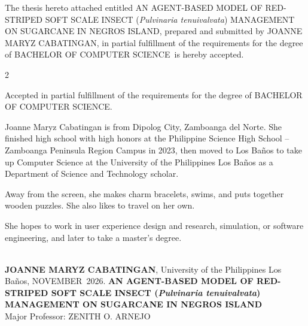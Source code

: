 \documentclass{icsthesis}
\renewcommand{\TITLE}{AN AGENT-BASED MODEL OF RED-STRIPED SOFT SCALE INSECT (\emph{Pulvinaria tenuivalvata}) MANAGEMENT ON SUGARCANE IN NEGROS ISLAND}
\renewcommand{\AUTHOR}{JOANNE MARYZ CABATINGAN}
\renewcommand{\DEGREE}{BACHELOR OF COMPUTER SCIENCE}
\renewcommand{\MONTH}{NOVEMBER}
\renewcommand{\YEAR}{2026}
\begin{document}
	\begin{frontmatter}
		\maketitle

		\begin{approvalpage}
			\sloppy The thesis hereto attached entitled \TITLE , prepared and submitted by \AUTHOR , in partial fulfillment of the requirements for the degree of \DEGREE\ is hereby accepted.

			\begin{multicols}{2}
				\centering
				\columnbreak
			\end{multicols}

			Accepted in partial fulfillment of the requirements for the degree of \DEGREE .
		\end{approvalpage}

		\begin{biosketch}
			Joanne Maryz Cabatingan is from Dipolog City, Zamboanga del Norte. She finished high school with high honors at the Philippine Science High School -- Zamboanga Peninsula Region Campus in 2023, then moved to Los Ba\~{n}os to take up Computer Science at the University of the Philippines Los Ba\~{n}os as a Department of Science and Technology scholar.

			Away from the screen, she makes charm bracelets, swims, and puts together wooden puzzles. She also likes to travel on her own.

			She hopes to work in user experience design and research, simulation, or software engineering, and later to take a master's degree.

			\addauthorsignaturefield
		\end{biosketch}

		\begin{acknowledgement}
			\lipsum[4]
		\end{acknowledgement}

		\maketableofcontents
		\makelistoftables
		\makelistoffigures

		\begin{abstractwithpageno}
		\setlength{\emergencystretch}{1.5em}
		\\
		\textbf{\AUTHOR}, University of the Philippines Los Ba\~{n}os, \MONTH\ \YEAR. \textbf{\TITLE}
		\\Major Professor: ZENITH O. ARNEJO\\

			
		\end{abstractwithpageno}
	\end{frontmatter}

	\begin{mainmatter}
		\setlength{\emergencystretch}{3em}
		
		
		
		

	\end{mainmatter}
\end{document}
